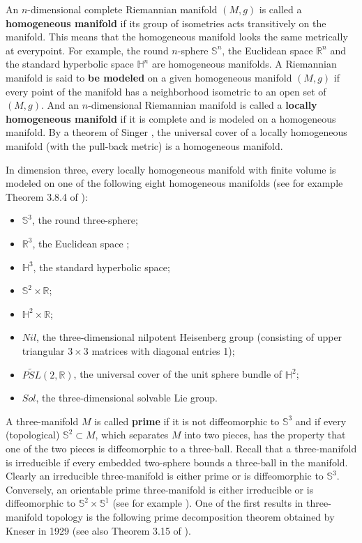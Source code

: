 An $n$-dimensional complete Riemannian manifold $(M,g)$ is called
a \textbf{homogeneous manifold} if its
group of isometries acts transitively on the manifold. This means
that the homogeneous manifold looks the same metrically at
everypoint. For example, the round $n$-sphere $\mathbb{S}^n$, the
Euclidean space $\mathbb{R}^n$ and the standard hyperbolic space
$\mathbb{H}^n$ are homogeneous manifolds.  A Riemannian manifold
is said to \textbf{be modeled} on a given
homogeneous manifold $(M,g)$ if every point of the manifold has a
neighborhood isometric to an open set of $(M,g)$. And an
$n$-dimensional Riemannian manifold is called a \textbf{locally
homogeneous manifold} if it is
complete and is modeled on a homogeneous manifold. By a theorem of
Singer \cite{Sin}, the universal cover of a locally homogeneous
manifold (with the pull-back metric) is a homogeneous manifold.

In dimension three, every locally homogeneous manifold with finite
volume is modeled on one of the following eight homogeneous
manifolds (see for example Theorem 3.8.4 of \cite{Th97}):
\begin{itemize}
\item[(1)] $\mathbb{S}^3$, the round three-sphere; \item[(2)]
$\mathbb{R}^3$, the Euclidean space ; \item[(3)] $\mathbb{H}^3$,
the standard hyperbolic space; \item[(4)] $\mathbb{S}^2 \times
\mathbb{R}$; \item[(5)] $\mathbb{H}^2 \times \mathbb{R}$;
\item[(6)] $Nil$, the three-dimensional nilpotent Heisenberg group
(consisting of upper triangular $3\times 3$ matrices with diagonal
entries 1); \item[(7)] $\widetilde{PSL}(2,\mathbb{R})$, the
universal cover of the unit sphere bundle of $\mathbb{H}^2$;
\item[(8)] $Sol$, the three-dimensional solvable Lie group.
\end{itemize}

\medskip
A three-manifold $M$ is called \textbf{prime} if it
is not diffeomorphic to $\mathbb{S}^3$ and if every (topological)
$\mathbb{S}^2 \subset M$, which separates $M$ into two pieces, has
the property that one of the two pieces is diffeomorphic to a
three-ball. Recall that a three-manifold is irreducible if every
embedded two-sphere bounds a three-ball in the manifold. Clearly
an irreducible three-manifold is either prime or is diffeomorphic
to $\mathbb{S}^3$. Conversely, an orientable prime three-manifold
is either irreducible or is diffeomorphic to $\mathbb{S}^2 \times
\mathbb{S}^1$ (see for example \cite{Hempel}). One of the first
results in three-manifold topology is the following prime
decomposition theorem obtained by Kneser \cite{Kn} in 1929 (see
also Theorem 3.15 of \cite{Hempel}).

